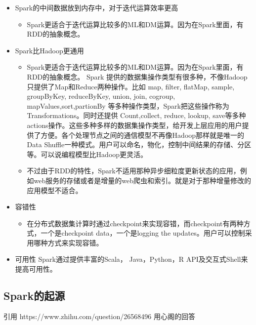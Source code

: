     \begin{itemize}
    \item Spark的中间数据放到内存中，对于迭代运算效率更高
      \begin{itemize}
      \item Spark更适合于迭代运算比较多的ML和DM运算。因为在Spark里面，有RDD的抽象概念。
      \end{itemize}
    \item Spark比Hadoop更通用
      \begin{itemize}
      \item Spark更适合于迭代运算比较多的ML和DM运算。因为在Spark里面，有RDD的抽象概念。
      Spark 提供的数据集操作类型有很多种，不像Hadoop只提供了Map和Reduce两种操作。比如 map, filter, flatMap, sample, groupByKey, reduceByKey, union, join, cogroup, mapValues,sort,partionBy 等多种操作类型，Spark把这些操作称为Transformations。同时还提供 Count,collect, reduce, lookup, save等多种actions操作。这些多种多样的数据集操作类型，给开发上层应用的用户提供了方便。各个处理节点之间的通信模型不再像Hadoop那样就是唯一的Data Shuffle一种模式。用户可以命名，物化，控制中间结果的存储、分区等。可以说编程模型比Hadoop更灵活。
      \item 不过由于RDD的特性，Spark不适用那种异步细粒度更新状态的应用，例如web服务的存储或者是增量的web爬虫和索引。就是对于那种增量修改的应用模型不适合。
      \end{itemize}
    \item 容错性
      \begin{itemize}
      \item 在分布式数据集计算时通过checkpoint来实现容错，而checkpoint有两种方式，一个是checkpoint data，一个是logging the updates。用户可以控制采用哪种方式来实现容错。
      \end{itemize}
    \item 可用性
    Spark通过提供丰富的Scala， Java，Python，R API及交互式Shell来提高可用性。
    \end{itemize}
    
    \subsection{Spark的起源}
    引用 https://www.zhihu.com/question/26568496 用心阁的回答

